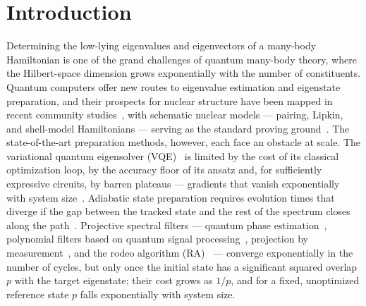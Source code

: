 \documentclass[
  aps,            %
  prc,            %
  reprint,        %
  superscriptaddress,
  floatfix,
  nofootinbib
]{revtex4-2}
\begin{document}
\maketitle



\section{Introduction}
Determining the low-lying eigenvalues and eigenvectors of a many-body Hamiltonian is
one of the grand challenges of quantum many-body theory, where the Hilbert-space
dimension grows exponentially with the number of constituents.  Quantum computers
offer new routes to eigenvalue estimation and eigenstate preparation, and their
prospects for nuclear structure have been mapped in recent community
studies~\cite{Beck2023,Bauer2023,LeeReview2023}, with schematic nuclear models ---
pairing, Lipkin, and shell-model Hamiltonians --- serving as the standard proving
ground~\cite{Ovrum2007,Hlatshwayo2022,Stetcu2022,PerezObiol2023,Jiang2023,Zhang2024,Lacroix2023}.
The state-of-the-art preparation methods, however, each face an obstacle at scale.
The variational quantum eigensolver (VQE)~\cite{Peruzzo2014} is limited by the cost
of its classical optimization loop, by the accuracy floor of its ansatz and, for
sufficiently expressive circuits, by barren plateaus --- gradients that vanish
exponentially with system size~\cite{McClean2018,Larocca2025}.  Adiabatic state
preparation requires evolution times that diverge if the gap between the tracked
state and the rest of the spectrum closes along the path~\cite{Albash2018}.
Projective spectral filters --- quantum phase estimation~\cite{Abrams1999},
polynomial filters based on quantum signal processing~\cite{LinTong2020,Dong2022},
projection by measurement~\cite{Stetcu2023}, and the rodeo algorithm
(RA)~\cite{Choi2021,Qian2024,Cohen2023,BeeLindgren2022,Patkowski2026} --- converge
exponentially in the number of cycles, but only once the initial state has a
significant squared overlap $p$ with the target eigenstate; their cost grows as
$1/p$, and for a fixed, unoptimized reference state $p$ falls exponentially with
system size.
\end{document}

